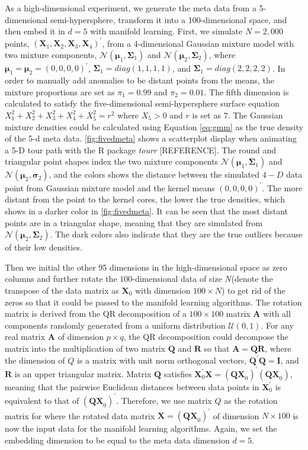 \documentclass[11pt,a4paper,]{article}
\begin{document}
As a high-dimensional experiment, we generate the meta data from a 5-dimensional semi-hypersphere, transform it into a 100-dimensional space, and then embed it in \(d=5\) with manifold learning. First, we simulate \(N=2,000\) points,
\((\pmb{X}_1, \pmb{X}_2, \pmb{X}_3, \pmb{X}_4)^\prime\), from a 4-dimensional Gaussian mixture model with two mixture components,
\(\mathcal{N}(\pmb{\mu}_1, \pmb{\Sigma}_1)\) and \(\mathcal{N}(\pmb{\mu}_2, \pmb{\Sigma}_2)\), where \(\pmb{\mu}_1 = \pmb{\mu}_2 =(0, 0, 0, 0)^\prime\), \(\pmb{\Sigma}_1 = diag(1,1,1,1)\), and \(\pmb{\Sigma}_1 = diag(2,2,2,2)\).
In order to manually add anomalies to be distant points from the means, the mixture proportions are set as \(\pi_1=0.99\) and \(\pi_2=0.01\). The fifth dimension is calculated to satisfy the five-dimensional semi-hypersphere surface equation
\(X_1^2 + X_2^2 + X_3^2 + X_4^2 + X_5^2 = r^2\) where \(X_5>0\) and \(r\) is set as \(7\). The Gaussian mixture densities could be calculated using Equation \eqref{eq:gmm} as the true density of the 5-d meta data.
\autoref{fig:fivedmeta} shows a scatterplot display when animating a 5-D tour path with the R package \emph{tourr} {[}REFERENCE{]}. The round and triangular point shapes index the two mixture components \(\mathcal{N}(\pmb{\mu}_1, \pmb{\Sigma}_1)\) and
\(\mathcal{N}(\pmb{\mu}_2, \pmb{\sigma}_2)\), and the colors shows the distance between the simulated \(4-D\) data point from Gaussian mixture model and the kernel means \((0, 0, 0, 0)^\prime\). The more distant from the point to the kernel cores, the lower the true densities, which shows in a darker color in \autoref{fig:fivedmeta}. It can be seen that the most distant points are in a triangular shape, meaning that they are simulated from \(\mathcal{N}(\pmb{\mu}_2, \pmb{\Sigma}_2)\). The dark colors also indicate that they are the true outliers because of their low densities.

Then we initial the other 95 dimensions in the high-dimensional space as zero columns and further rotate the \(100\)-dimensional data of size \(N\)(denote the transpose of the data matrix as \(\pmb{X}_0\) with dimension \(100 \times N\)) to get rid of the zeros so that it could be passed to the manifold learning algorithms. The rotation matrix is derived from the QR decomposition of a \(100\times 100\) matrix \(\pmb{A}\) with all components randomly generated from a uniform distribution \(\mathcal{U}(0,1)\). For any real matrix \(\pmb{A}\) of dimension \(p\times q\), the QR decomposition could decompose the matrix into the multiplication of two matrix \(\pmb{Q}\) and \(\pmb{R}\) so that \(\pmb{A} = \pmb{QR}\), where the dimension of \(Q\) is a matrix with unit norm orthogonal vectors, \(\pmb{Q}^\prime \pmb{Q} = \pmb{I}\), and \(\pmb{R}\) is an upper triangular matrix. Matrix \(\pmb{Q}\) satisfies
\(\pmb{X}_0^\prime \pmb{X}=(\pmb{QX}_0)^\prime(\pmb{QX}_0)\), meaning that the pairwise Euclidean distances between data points in
\(\pmb{X}_0^\prime\) is equivalent to that of \((\pmb{QX}_0)^\prime\).
Therefore, we use matrix \(Q\) as the rotation matrix for where the rotated data matrix \(\pmb{X} = (\pmb{QX}_0)^\prime\) of dimension \(N \times 100\) is now the input data for the manifold learning algorithms. Again, we set the embedding dimension to be equal to the meta data dimension \(d=5\).
\end{document}
